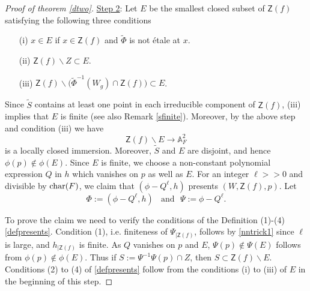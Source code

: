 \documentclass[10pt]{amsart}
\theoremstyle{plain}
\theoremstyle{definition}
\newcommand{\intersection}{\cap}
\newcommand{\Char}{{\rm char}}
\renewcommand{\tilde}{\widetilde}
\newcommand{\A}{{\mathbb A}}
\let\syn\mathsf
\begin{document}
\begin{proof}[Proof of theorem \ref{dtwo}]
\noindent \underline{Step 2}: Let $E$  be the smallest closed subset of $\syn{Z}(f)$ satisfying the following three conditions 
\begin{enumerate}
\item[(i)] $x\in E$ if $x\in \syn{Z}(f)$ and $\widetilde{\Phi}$ is not \'{e}tale at $x$.
\item[(ii)]  $\syn{Z}(f)\backslash Z\subset E$. 
\item[(iii)] $\syn{Z}(f) \backslash \big(\widetilde{\Phi}^{-1}(W_g) \intersection \syn{Z}(f)\big) \subset E$. 
\end{enumerate}
Since $\tilde{S}$ contains at least one point in each irreducible component of $\syn{Z}(f)$, (iii) implies that $E$ is finite (see also Remark \ref{sfinite}). Moreover, by the above step and condition (iii) we have 
$$ \syn{Z}(f) \backslash E \longrightarrow \A^2_F$$ 
is a locally closed immersion. Moreover, $\tilde{S}$ and $E$ are disjoint, and hence $\phi(p) \notin \phi(E)$. Since $E$ is finite, we choose a non-constant polynomial expression $Q$ in $h$ which vanishes on $p$ as well as $E$. For an integer $\ell >>0$ and divisible by $\Char(F)$, we claim that $(\phi-Q^\ell, h)$ presents $(W,\syn{Z}(f),p)$. Let 
$$ \Phi:= (\phi-Q^\ell, h) \ \ \ \ \text{and} \ \ \ \Psi:= \phi-Q^{\ell}.$$ 

To prove the claim we need to verify the conditions of the Definition (1)-(4) \ref{defpresents}. 
Condition (1), i.e. finiteness of $\Psi_{|\syn{Z}(f)}$, follows by \eqref{nntrick1} since 
 $\ell$ is large, and $h_{|\syn{Z}(f)}$ is finite. As $Q$  vanishes on $p$ and $E$, $\Psi(p)\notin \Psi(E)$ follows from $\phi(p)\notin \phi(E)$. Thus if $S:= \Psi^{-1}\Psi(p)\intersection Z$, then $S \subset \syn{Z}(f)\backslash E$. Conditions (2) to (4) of \eqref{defpresents} follow from the conditions (i) to (iii) of $E$ in the beginning of this step. 
 \end{proof}






\end{document}
